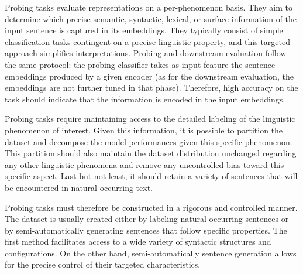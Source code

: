
Probing tasks evaluate representations on a per-phenomenon basis. They aim to determine which precise semantic, syntactic, lexical, or surface information of the input sentence is captured in its embeddings. They typically consist of simple classification tasks contingent on a precise linguistic property, and this targeted approach simplifies interpretations. Probing and downstream evaluation follow the same protocol: the probing classifier takes as input feature the sentence embeddings produced by a given encoder (as for the downstream evaluation, the embeddings are not further tuned in that phase). Therefore, high accuracy on the task should indicate that the information is encoded in the input embeddings.

Probing tasks require maintaining access to the detailed labeling of the linguistic phenomenon of interest. Given this information, it is possible to partition the dataset and decompose the model performances given this specific phenomenon. This partition should also maintain the dataset distribution unchanged regarding any other linguistic phenomena and remove any uncontrolled bias toward this specific aspect. Last but not least, it should retain a variety of sentences that will be encountered in natural-occurring text.

Probing tasks must therefore be constructed in a rigorous and controlled manner. The dataset is usually created either by labeling natural occurring sentences or by semi-automatically generating sentences that follow specific properties. The first method facilitates access to a wide variety of syntactic structures and configurations. On the other hand, semi-automatically sentence generation allows for the precise control of their targeted characteristics.


